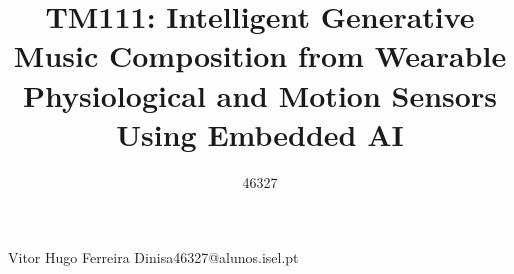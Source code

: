 \def\thetitle{%
 TM111: Intelligent Generative Music Composition from Wearable Physiological and Motion Sensors Using Embedded AI
}
\def\theauthor{%
 VD
}

\title{ \thetitle }

\author{46327}{Vitor Hugo Ferreira Dinis}{a46327@alunos.isel.pt}



